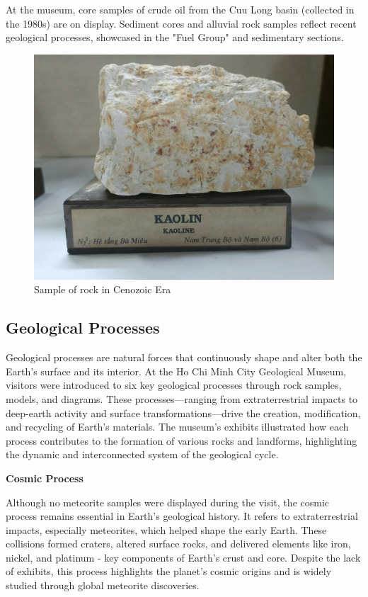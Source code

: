 At the museum, core samples of crude oil from the Cuu Long basin (collected in the 1980s) are on display. Sediment cores and alluvial rock samples reflect recent geological processes, showcased in the "Fuel Group" and sedimentary sections.

\begin{figure}[H]
  \centering
  \includegraphics[max width=0.8\linewidth]{graphics/figure_06.jpg}
  \caption{Sample of rock in Cenozoic Era}
  \label{fig:cenozoic-rock}
\end{figure}

\subsection{Geological Processes}
\label{subsec:geological-processes}

Geological processes are natural forces that continuously shape and alter both the Earth's surface and its interior. At the Ho Chi Minh City Geological Museum, visitors were introduced to six key geological processes through rock samples, models, and diagrams. These processes—ranging from extraterrestrial impacts to deep-earth activity and surface transformations—drive the creation, modification, and recycling of Earth's materials. The museum's exhibits illustrated how each process contributes to the formation of various rocks and landforms, highlighting the dynamic and interconnected system of the geological cycle.

\textbf{Cosmic Process}

Although no meteorite samples were displayed during the visit, the cosmic process remains essential in Earth's geological history. It refers to extraterrestrial impacts, especially meteorites, which helped shape the early Earth. These collisions formed craters, altered surface rocks, and delivered elements like iron, nickel, and platinum - key components of Earth's crust and core. Despite the lack of exhibits, this process highlights the planet's cosmic origins and is widely studied through global meteorite discoveries.

